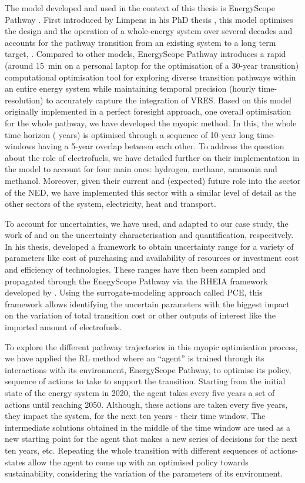 The model developed and used in the context of this thesis is EnergyScope Pathway \cite{limpens2024pathway}. First introduced by Limpens in his PhD thesis \cite{limpens2021generating}, this model optimises the design and the operation of a whole-energy system over several decades and accounts for the pathway transition from an existing system to a long term target, .  Compared to other models, EnergyScope Pathway introduces a rapid (\ie around 15~min on a personal laptop for the optimisation of a 30-year transition) computational optimisation tool for exploring diverse transition pathways within an entire energy system while maintaining temporal precision (\ie hourly time-resolution) to accurately capture the integration of \gls{VRES}. Based on this model originally implemented in a perfect foresight approach, \ie one overall optimisation for the whole pathway, we have developed the myopic method. In this, the whole time horizon ( years) is optimised through a sequence of 10-year long time-windows having a 5-year overlap between each other. To address the question about the role of electrofuels, we have detailed further on their implementation in the model to account for four main ones: hydrogen, methane, ammonia and methanol. Moreover, given their current and (expected) future role into the sector of the \gls{NED}, we have implemented this sector with a similar level of detail as the other sectors of the system, \ie electricity, heat and transport. 

To account for uncertainties, we have used, and adapted to our case study, the work of \citet{Moret2017PhDThesis} and \citet{coppittersthesis} on the uncertainty characterisation and quantification, respecitvely. In his thesis, \citet{Moret2017PhDThesis} developed a framework to obtain uncertainty range for a variety of parameters like cost of purchasing and availability of resources or investment cost and efficiency of technologies. These ranges have then been sampled and propagated through the EnegyScope Pathway via the RHEIA framework developed by \citet{coppittersthesis}. Using the surrogate-modeling approach called \gls{PCE}, this framework allows identifying the uncertain parameters with the biggest impact on the variation of total transition cost or other outputs of interest like the imported amount of electrofuels. 

To explore the different pathway trajectories in this myopic optimisation process, we have applied the \gls{RL} method where an ``agent'' is trained through its interactions with its environment, EnergyScope Pathway, to optimise its policy, \ie sequence of actions to take to support the transition. Starting from the initial state of the energy system in 2020, the agent takes every five years a set of actions until reaching 2050. Although, these actions are taken every five years, they impact the system, for the next ten years - their time window. The intermediate solutions obtained in the middle of the time window are used as a new starting point for the agent that makes a new series of decisions for the next ten years, etc. Repeating the whole transition with different sequences of actions-states allow the agent to come up with an optimised policy towards sustainability, considering the variation of the parameters of its environment.


